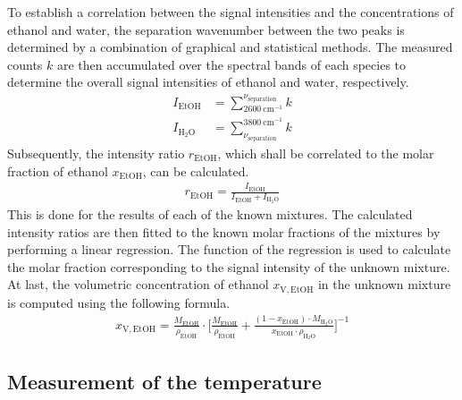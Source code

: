 To establish a correlation between the signal intensities and the concentrations of ethanol and water, the separation wavenumber between the two peaks is determined by a combination of graphical and statistical methods. The measured counts $k$ are then accumulated over the spectral bands of each species to determine the overall signal intensities of ethanol and water, respectively.
\begin{align}
    I_\mathrm{EtOH}&=\sum_{2600~\mathrm{cm^{-1}}}^{\nu_\mathrm{separation}} k \\[12pt]
    I_\mathrm{H_2O}&=\sum_{\nu_\mathrm{separation}}^{3800~\mathrm{cm^{-1}}} k
\end{align}
Subsequently, the intensity ratio $r_\mathrm{EtOH}$, which shall be correlated to the molar fraction of ethanol $x_\mathrm{EtOH}$, can be calculated.
\begin{align}
    r_\mathrm{EtOH}=\frac{I_\mathrm{EtOH}}{I_\mathrm{EtOH}+I_\mathrm{H_2O}}
\end{align}
This is done for the results of each of the known mixtures. The calculated intensity ratios are then fitted to the known molar fractions of the mixtures by performing a linear regression. The function of the regression is used to calculate the molar fraction corresponding to the signal intensity of the unknown mixture. At last, the volumetric concentration of ethanol $x_\mathrm{V,EtOH}$ in the unknown mixture is computed using the following formula.
\begin{align}
    x_\mathrm{V,EtOH}=\frac{M_\mathrm{EtOH}}{\rho_\mathrm{EtOH}} \cdot \bigg[ \frac{M_\mathrm{EtOH}}{\rho_\mathrm{EtOH}} + \frac{(1-x_\mathrm{EtOH}) \cdot M_\mathrm{H_2O}}{x_\mathrm{EtOH} \cdot \rho_\mathrm{H_2O}} \bigg]^{-1}
\end{align}

\subsection{Measurement of the temperature}

